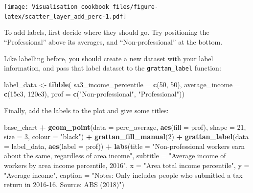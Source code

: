 \documentclass[
]{book}
\newenvironment{Shaded}{\begin{snugshade}}{\end{snugshade}}
\newcommand{\DataTypeTok}[1]{\textcolor[rgb]{0.13,0.29,0.53}{#1}}
\newcommand{\DecValTok}[1]{\textcolor[rgb]{0.00,0.00,0.81}{#1}}
\newcommand{\FloatTok}[1]{\textcolor[rgb]{0.00,0.00,0.81}{#1}}
\newcommand{\KeywordTok}[1]{\textcolor[rgb]{0.13,0.29,0.53}{\textbf{#1}}}
\newcommand{\NormalTok}[1]{#1}
\newcommand{\OperatorTok}[1]{\textcolor[rgb]{0.81,0.36,0.00}{\textbf{#1}}}
\newcommand{\StringTok}[1]{\textcolor[rgb]{0.31,0.60,0.02}{#1}}
\begin{document}
\texttt{[image: Visualisation\_cookbook\_files/figure-latex/scatter\_layer\_add\_perc-1.pdf]}

To add labels, first decide where they should go. Try positioning the ``Professional'' above its averages, and ``Non-professional'' at the bottom.

Like labelling before, you should create a new dataset with your label information, and pass that label dataset to the \texttt{grattan\_label} function:

\begin{Shaded}
\begin{Highlighting}[]
\NormalTok{label\_data \textless{}{-}}\StringTok{ }\KeywordTok{tibble}\NormalTok{(}
  \DataTypeTok{sa3\_income\_percentile =} \KeywordTok{c}\NormalTok{(}\DecValTok{50}\NormalTok{, }\DecValTok{50}\NormalTok{),}
  \DataTypeTok{average\_income =} \KeywordTok{c}\NormalTok{(}\FloatTok{15e3}\NormalTok{, }\FloatTok{120e3}\NormalTok{),}
  \DataTypeTok{prof =}  \KeywordTok{c}\NormalTok{(}\StringTok{"Non{-}professional"}\NormalTok{, }\StringTok{"Professional"}\NormalTok{))}
\end{Highlighting}
\end{Shaded}

Finally, add the labels to the plot and give some titles:

\begin{Shaded}
\begin{Highlighting}[]
\NormalTok{base\_chart }\OperatorTok{+}
\StringTok{  }\KeywordTok{geom\_point}\NormalTok{(}\DataTypeTok{data =}\NormalTok{ perc\_average,}
             \KeywordTok{aes}\NormalTok{(}\DataTypeTok{fill =}\NormalTok{ prof),}
             \DataTypeTok{shape =} \DecValTok{21}\NormalTok{,}
             \DataTypeTok{size =} \DecValTok{3}\NormalTok{, }
             \DataTypeTok{colour =} \StringTok{"black"}\NormalTok{) }\OperatorTok{+}\StringTok{ }
\StringTok{  }\KeywordTok{grattan\_fill\_manual}\NormalTok{(}\DecValTok{2}\NormalTok{) }\OperatorTok{+}\StringTok{ }
\StringTok{  }\KeywordTok{grattan\_label}\NormalTok{(}\DataTypeTok{data =}\NormalTok{ label\_data,}
                \KeywordTok{aes}\NormalTok{(}\DataTypeTok{label =}\NormalTok{ prof)) }\OperatorTok{+}\StringTok{ }
\StringTok{  }\KeywordTok{labs}\NormalTok{(}\DataTypeTok{title =} \StringTok{"Non{-}professional workers earn about the same, regardless of area income"}\NormalTok{,}
       \DataTypeTok{subtitle =} \StringTok{"Average income of workers by area income percentile, 2016"}\NormalTok{,}
       \DataTypeTok{x =} \StringTok{"Area total income percentile"}\NormalTok{,}
       \DataTypeTok{y =} \StringTok{"Average income"}\NormalTok{,}
       \DataTypeTok{caption =} \StringTok{"Notes: Only includes people who submitted a tax return in 2016{-}16. Source: ABS (2018)"}\NormalTok{)}
\end{Highlighting}
\end{Shaded}
\end{document}
